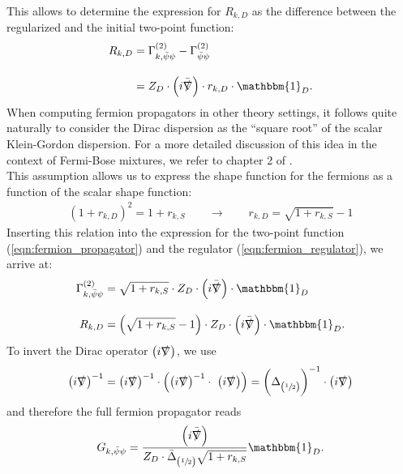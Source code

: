 This allows to determine the expression for $R_{k, D}$ as the difference between the regularized and the initial two-point function:
\begin{equation}
\begin{aligned}
	R_{k,D} &= \Gamma^{(2)}_{k, \bar{\psi}\psi} - \Gamma^{(2)}_{\bar{\psi}\psi} \\[10pt]
	&= Z_D\cdot\left(i\bar{\slashed{\nabla}}\right)\cdot r_{k,D} \cdot\mathbbm{1}_D. \label{eqn:fermion_regulator}
\end{aligned}
\end{equation}
When computing fermion propagators in other theory settings, it follows quite naturally to consider the Dirac dispersion as the \enquote{square root} of the scalar Klein-Gordon dispersion. For a more detailed discussion of this idea in the context of Fermi-Bose mixtures, we refer to chapter 2 of \cite{PawlowskiNPgaugeLecture}. \\
This assumption allows us to express the shape function for the fermions as a function of the scalar shape function:
\begin{align}
\left(1+r_{k,D}\right)^2 = 1+r_{k,S} \qquad \longrightarrow \qquad r_{k, D} = \sqrt{1+r_{k,S}} - 1
\end{align}
Inserting this relation into the expression for the two-point function (\ref{eqn:fermion_propagator}) and the regulator (\ref{eqn:fermion_regulator}), we arrive at:
\begin{equation}
\begin{aligned}
	\Gamma^{(2)}_{k, \bar{\psi}\psi} &=\sqrt{1+r_{k,S}}\cdot Z_D\cdot\left(i\bar{\slashed{\nabla}}\right)\cdot\mathbbm{1}_D \\[10pt] 
	R_{k,D} &= \left(\sqrt{1+r_{k,S}} -1 \right)\cdot Z_D\cdot\left(i\bar{\slashed{\nabla}}\right)\cdot\mathbbm{1}_D.
\end{aligned}
\end{equation}
To invert the Dirac operator $\left(i\slashed{\nabla}\right)$, we use
\begin{equation}
	\left(i\slashed{\nabla}\right)^{-1} =\left(i\slashed{\nabla}\right)^{-1}\cdot\left(\left(i\slashed{\nabla}\right)^{-1}\cdot \ \left(i\slashed{\nabla}\right)\right) = \left(\Delta_{\left(\sfrac{1}{2}\right)}\right)^{-1}\cdot\left(i\slashed{\nabla}\right)
\end{equation}
and therefore the full fermion propagator reads
\begin{equation}
	G_{k, \bar{\psi}\psi} = \frac{\left(i\bar{\slashed{\nabla}}\right)}{Z_D\cdot\bar{\Delta}_{\left(\sfrac{1}{2}\right)}\sqrt{1+r_{k,S}}}\mathbbm{1}_D.
\end{equation}

